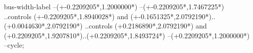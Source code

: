 {\begin{scope}[x=1mm,y=1mm,line width=\SCstroke mm,line cap=round,line join=round]
\begin{SCpart}{bus-width-label}
      --({\SCbusx+-0.2209205*\SCscale},{1.2000000*\SCscale})
      --({\SCbusx+-0.2209205*\SCscale},{1.7467225*\SCscale})
      ..controls ({\SCbusx+-0.2209205*\SCscale},{1.8940028*\SCscale}) and ({\SCbusx+-0.1651325*\SCscale},{2.0792190*\SCscale})..({\SCbusx+0.0044630*\SCscale},{2.0792190*\SCscale})
      ..controls ({\SCbusx+0.2186890*\SCscale},{2.0792190*\SCscale}) and ({\SCbusx+0.2209205*\SCscale},{1.9207810*\SCscale})..({\SCbusx+0.2209205*\SCscale},{1.8493724*\SCscale})
      --({\SCbusx+0.2209205*\SCscale},{1.2000000*\SCscale})
      --cycle;
    \end{SCpart}
  \end{scope}%
}